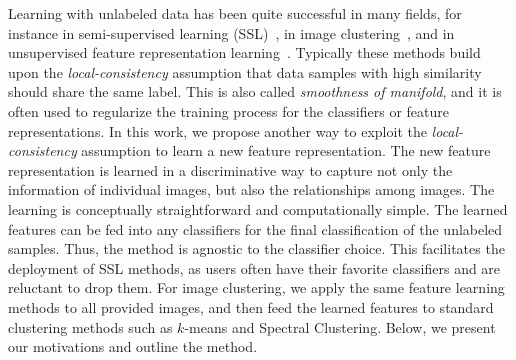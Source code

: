 Learning with unlabeled data has been quite successful in many fields, for instance in semi-supervised learning 
(SSL)~\citep{Zhou:nips:04, deep:semi:embedding, Fergus09, SemiForest, Zhu:ISL:2009, 
nips14:ssl}, in image clustering~\citep{Grauman06, Frey_AffinityPropagation, dai:cvpr10}, and in 
unsupervised feature representation learning~\citep{stl-10, cnnfet14, feature:LSTM, feature:video}. 
Typically these methods build upon the
\emph{local-consistency} assumption that data samples with high
similarity should share the same label. This is also called
\emph{smoothness of manifold}, and it is often used to regularize the training process for the classifiers or feature
 representations.  
In this work, we propose another way to exploit the \emph{local-consistency} assumption to 
learn a new feature representation. 
The new feature
representation is learned in a discriminative way to capture not only
the information of individual images, but also the relationships among
images. The learning is conceptually straightforward and
computationally simple. The learned features can be fed into any
classifiers for the final classification of the unlabeled samples.
Thus, the method is agnostic to the classifier choice. This facilitates the
deployment of SSL methods, as users often have their favorite
classifiers and are reluctant to drop them. For image clustering, we
apply the same feature learning methods to all provided images, and
then feed the learned features to standard clustering methods such as
$k$-means and Spectral Clustering.  Below, we present our motivations
and outline the method.

